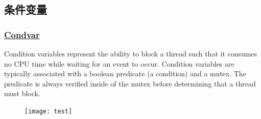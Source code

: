 % 
% 
% 
% 
% 
% 
\subsection{条件变量} %
\begin{frame}[fragile]
    \frametitle{\href{https://doc.rust-lang.org/std/sync/struct.Condvar.html}{Condvar}}

Condition variables represent the ability to block a thread such that it consumes no CPU time while waiting for an event to occur. Condition variables are typically associated with a boolean predicate (a condition) and a mutex. The predicate is always verified inside of the mutex before determining that a thread must block.

    \begin{figure}
    \texttt{[image: test]}
    \end{figure}

\end{frame}
% 
% 
% 
% 
% 
% 
% 
